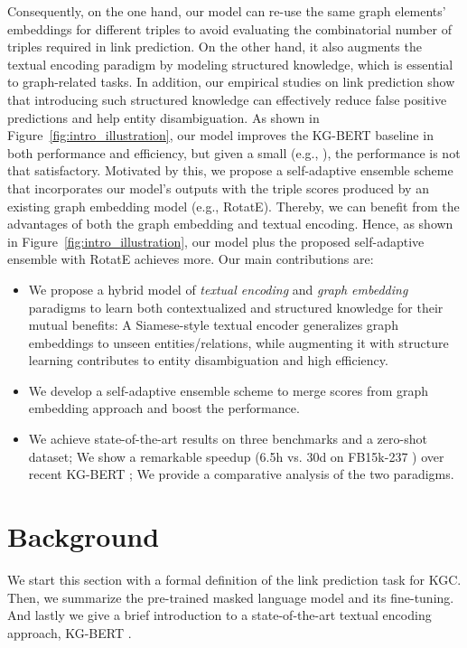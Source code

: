 \documentclass[sigconf]{acmart}
\begin{document}
Consequently, on the one hand, our model can re-use the same graph elements' embeddings for different triples to avoid evaluating the combinatorial number of triples required in link prediction. On the other hand, it also augments the textual encoding paradigm by modeling structured knowledge, which is essential to graph-related tasks. 
In addition, our empirical studies on link prediction show that introducing such structured knowledge can effectively reduce false positive predictions and help entity disambiguation. 
As shown in Figure~\ref{fig:intro_illustration}, our model improves the KG-BERT baseline in both performance and efficiency, but given a small  (e.g., ), the performance is not that satisfactory. 
Motivated by this, we propose a self-adaptive ensemble scheme that incorporates our model's outputs with the triple scores produced by an existing graph embedding model (e.g., RotatE). Thereby, we can benefit from the advantages of both the graph embedding and textual encoding. Hence, as shown in Figure~\ref{fig:intro_illustration}, our model plus the proposed self-adaptive ensemble with RotatE achieves more.
Our main contributions are:
\begin{itemize}
    \item We propose a hybrid model of \textit{textual encoding} and \textit{graph embedding} paradigms to learn both contextualized and structured knowledge for their mutual benefits: A Siamese-style textual encoder generalizes graph embeddings to unseen entities/relations, while augmenting it with structure learning contributes to entity disambiguation and high efficiency. 
    \item We develop a self-adaptive ensemble scheme to merge scores from graph embedding approach and boost the performance. 
    \item We achieve state-of-the-art results on three benchmarks and a zero-shot dataset; We show a remarkable speedup (6.5h vs. 30d on FB15k-237 \cite{FB15k-237}) over recent KG-BERT \cite{yao2019kgbert}; We provide a comparative analysis of the two paradigms. 
\end{itemize}

\section{Background}  \label{sec:background}
We start this section with a formal definition of the link prediction task for KGC. 
Then, we summarize the pre-trained masked language model and its fine-tuning.
And lastly we give a brief introduction to a state-of-the-art textual encoding approach, KG-BERT \cite{yao2019kgbert}. 
\end{document}
